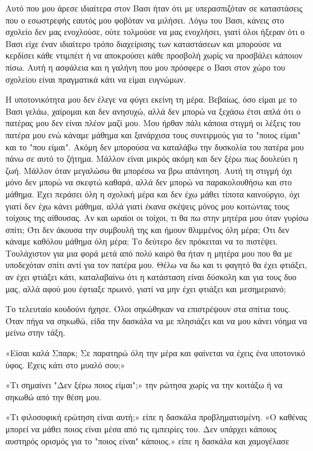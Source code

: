 \documentclass[12pt,twoside, openany]{book}
\begin{document}
Αυτό που μου άρεσε ιδιαίτερα στον Βασι ήταν ότι με υπερασπιζόταν σε καταστάσεις που ο εσωστρεφής εαυτός μου φοβόταν να μιλήσει. Λόγω του Βασι, κάνεις στο σχολείο δεν μας ενοχλούσε, ούτε τολμούσε να μας ενοχλήσει, γιατί όλοι ήξεραν ότι ο Βασι είχε έναν ιδιαίτερο τρόπο διαχείρισης των καταστάσεων και μπορούσε να κερδίσει κάθε ντιμπέιτ ή να αποκρούσει κάθε προσβολή χωρίς να προσβάλει κάποιον πίσω. Αυτή η ασφάλεια και η γαλήνη που μου πρόσφερε ο Βασι στον χώρο του σχολείου είναι πραγματικά κάτι να είμαι ευγνώμων. 

Η υποτονικότητα μου δεν έλεγε να φύγει εκείνη τη μέρα. Βεβαίως, όσο είμαι με το Βασι γελάω, χαίρομαι και δεν ανησυχώ, αλλά δεν μπορώ να ξεχάσω έτσι απλά ότι ο πατέρας μου δεν είναι πλέον μαζί μου. Μου ήρθαν πάλι κάποια στιγμή οι λέξεις του πατέρα μου ενώ κάναμε μάθημα και ξανάρχισα τους συνειρμούς για το "ποιος είμαι" και το "που είμαι". Ακόμη δεν μπορούσα να καταλάβω την δυσκολία του πατέρα μου πάνω σε αυτό το ζήτημα. Μάλλον είναι μικρός ακόμη και δεν ξέρω πως δουλεύει η ζωή. Μάλλον όταν μεγαλώσω θα μπορέσω να βρω απάντηση. Αυτή τη στιγμή όχι μόνο δεν μπορώ να σκεφτώ καθαρά, αλλά δεν μπορώ να παρακολουθήσω και στο μάθημα. Έχει περάσει όλη η σχολική μέρα και δεν έχω μάθει τίποτα καινούργιο, όχι γιατί δεν έχω κάνει μάθημα, αλλά γιατί έκανα σκέψεις μόνος μου κοιτώντας τους τοίχους της αίθουσας. Αν και ωραίοι οι τοίχοι, τι θα πω στην μητέρα μου όταν γυρίσω σπίτι; Ότι δεν άκουσα την συμβουλή της και ήμουν θλιμμένος όλη μέρα; Ότι δεν κάναμε καθόλου μάθημα όλη μέρα; Το δεύτερο δεν πρόκειται να το πιστέψει. Τουλάχιστον για μια φορά μετά από πολύ καιρό θα ήταν η μητέρα μου που θα με υποδεχόταν σπίτι αντί για τον πατέρα μου. Θέλω να δω και τι φαγητό θα έχει φτιάξει, αν έχει φτιάξει κάτι, καταλαβαίνω ότι η κατάσταση είναι δύσκολη και για τους δυο μας, αλλά αφού μου έφτιαξε πρωινό, γιατί να μην έχει φτιάξει και μεσημεριανό;

Το τελευταίο κουδούνι ήχησε. Όλοι σηκώθηκαν να επιστρέψουν στα σπίτια τους. Όταν πήγα να σηκωθώ, είδα την δασκάλα να με πλησιάζει και να μου κάνει νόημα να μείνω στην τάξη.

«Είσαι καλά Σπαρκ; Σε παρατηρώ όλη την μέρα και φαίνεται να έχεις ένα υποτονικό ύφος. Έχεις κάτι στο μυαλό σου;»

«Τι σημαίνει "Δεν ξέρω ποιος είμαι";» την ρώτησα χωρίς να την κοιτάξω ή να σηκωθώ από την θέση μου.

«Τι φιλοσοφική ερώτηση είναι αυτή;» είπε η δασκάλα προβληματισμένη. «Ο καθένας μπορεί να μάθει ποιος είναι μέσα από τις εμπειρίες του. Δεν υπάρχει κάποιος αυστηρός ορισμός για το "ποιος είναι" κάποιος.» είπε η δασκάλα και χαμογέλασε
\end{document}
